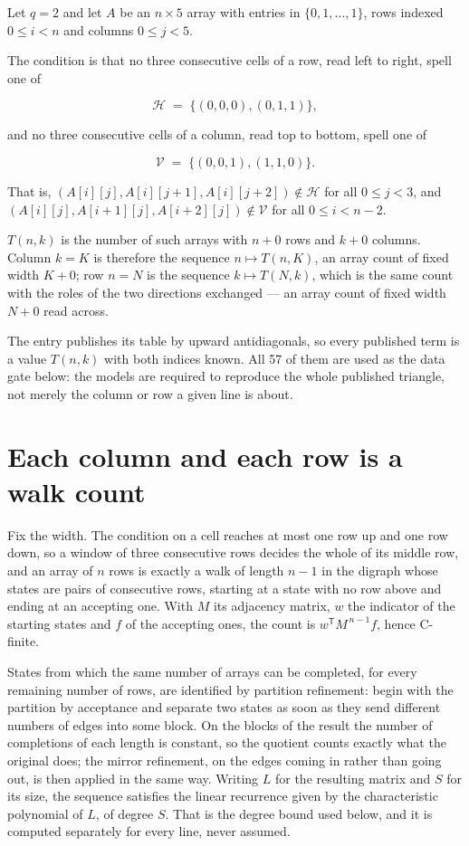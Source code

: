 \documentclass[11pt]{article}
\theoremstyle{definition}
\begin{document}
Let $q = 2$ and let $A$ be an $n \times 5$ array with entries in $\{0,1,\dots,1\}$, rows indexed $0 \le i < n$ and columns $0 \le j < 5$.

The condition is that no three consecutive cells of a row, read left to right, spell one of

\[\mathcal{H} \;=\; \{(0,0,0), (0,1,1)\},\]

and no three consecutive cells of a column, read top to bottom, spell one of

\[\mathcal{V} \;=\; \{(0,0,1), (1,1,0)\}.\]

That is, $(A[i][j],A[i][j{+}1],A[i][j{+}2]) \notin \mathcal{H}$ for all $0 \le j < 3$, and $(A[i][j],A[i{+}1][j],A[i{+}2][j]) \notin \mathcal{V}$ for all $0 \le i < n-2$.

$T(n,k)$ is the number of such arrays with $n + 0$ rows and $k + 0$ columns. Column $k = K$ is therefore the sequence $n \mapsto T(n,K)$, an array count of fixed width $K + 0$; row $n = N$ is the sequence $k \mapsto T(N,k)$, which is the same count with the roles of the two directions exchanged --- an array count of fixed width $N + 0$ read across.

The entry publishes its table by upward antidiagonals, so every published term is a value $T(n,k)$ with both indices known. All 57 of them are used as the data gate below: the models are required to reproduce the whole published triangle, not merely the column or row a given line is about.

\section{Each column and each row is a walk count}

Fix the width. The condition on a cell reaches at most one row up and one row down, so a window of three consecutive rows decides the whole of its middle row, and an array of $n$ rows is exactly a walk of length $n-1$ in the digraph whose states are pairs of consecutive rows, starting at a state with no row above and ending at an accepting one. With $M$ its adjacency matrix, $w$ the indicator of the starting states and $f$ of the accepting ones, the count is $w^{\mathsf T}M^{\,n-1}f$, hence C-finite.

States from which the same number of arrays can be completed, for every remaining number of rows, are identified by partition refinement: begin with the partition by acceptance and separate two states as soon as they send different numbers of edges into some block. On the blocks of the result the number of completions of each length is constant, so the quotient counts exactly what the original does; the mirror refinement, on the edges coming in rather than going out, is then applied in the same way. Writing $L$ for the resulting matrix and $S$ for its size, the sequence satisfies the linear recurrence given by the characteristic polynomial of $L$, of degree $S$. That is the degree bound used below, and it is computed separately for every line, never assumed.
\end{document}
